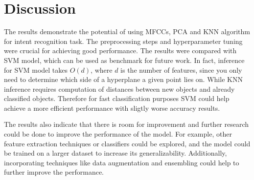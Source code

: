 \documentclass[conference]{IEEEtran}
\begin{document}
\section{Discussion}
The results demonstrate the potential of using MFCCs, PCA and KNN algorithm for intent recognition task.
The preprocessing steps and hyperparameter tuning were crucial for achieving good performance.
The results were compared with SVM model, which can be used as benchmark for future work.
In fact, inference for SVM model takes $O(d)$, where $d$ is the number of features, since you only need to determine which side of a hyperplane a given point lies on.
While KNN inference requires computation of distances between new objects and already classified objects.
Therefore for fast classification purposes SVM could help achieve a more efficient performance with sligtly worse accuracy results.


The results also indicate that there is room for improvement and further research could be done to improve the performance of the model.
For example, other feature extraction techniques or classifiers could be explored, and the model could be trained on a larger dataset to increase its generalizability.
Additionally, incorporating techniques like data augmentation and ensembling could help to further improve the performance.


\nocite{*}


\end{document}
